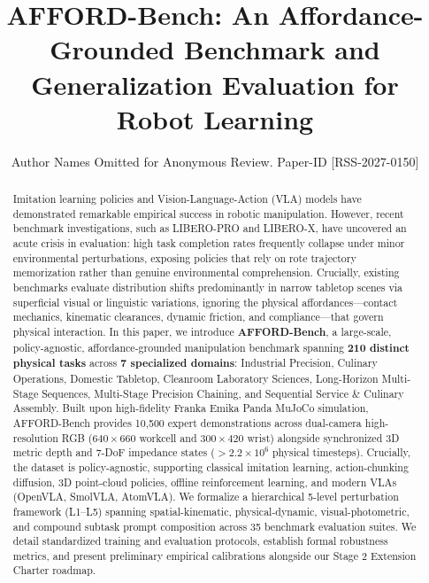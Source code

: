 \documentclass[conference]{IEEEtran}
\begin{document}
\title{AFFORD-Bench: An Affordance-Grounded Benchmark and Generalization Evaluation for Robot Learning}

\author{Author Names Omitted for Anonymous Review. Paper-ID [RSS-2027-0150]}

\maketitle

\begin{abstract}
Imitation learning policies and Vision-Language-Action (VLA) models have demonstrated remarkable empirical success in robotic manipulation. However, recent benchmark investigations, such as LIBERO-PRO and LIBERO-X, have uncovered an acute crisis in evaluation: high task completion rates frequently collapse under minor environmental perturbations, exposing policies that rely on rote trajectory memorization rather than genuine environmental comprehension. Crucially, existing benchmarks evaluate distribution shifts predominantly in narrow tabletop scenes via superficial visual or linguistic variations, ignoring the physical affordances---contact mechanics, kinematic clearances, dynamic friction, and compliance---that govern physical interaction. In this paper, we introduce \textbf{AFFORD-Bench}, a large-scale, policy-agnostic, affordance-grounded manipulation benchmark spanning \textbf{210 distinct physical tasks} across \textbf{7 specialized domains}: Industrial Precision, Culinary Operations, Domestic Tabletop, Cleanroom Laboratory Sciences, Long-Horizon Multi-Stage Sequences, Multi-Stage Precision Chaining, and Sequential Service \& Culinary Assembly. Built upon high-fidelity Franka Emika Panda MuJoCo simulation, AFFORD-Bench provides 10,500 expert demonstrations across dual-camera high-resolution RGB ($640\times 660$ workcell and $300\times 420$ wrist) alongside synchronized 3D metric depth and 7-DoF impedance states ($>2.2\times 10^6$ physical timesteps). Crucially, the dataset is policy-agnostic, supporting classical imitation learning, action-chunking diffusion, 3D point-cloud policies, offline reinforcement learning, and modern VLAs (OpenVLA, SmolVLA, AtomVLA). We formalize a hierarchical 5-level perturbation framework (L1--L5) spanning spatial-kinematic, physical-dynamic, visual-photometric, and compound subtask prompt composition across 35 benchmark evaluation suites. We detail standardized training and evaluation protocols, establish formal robustness metrics, and present preliminary empirical calibrations alongside our Stage 2 Extension Charter roadmap.
\end{abstract}
\end{document}
